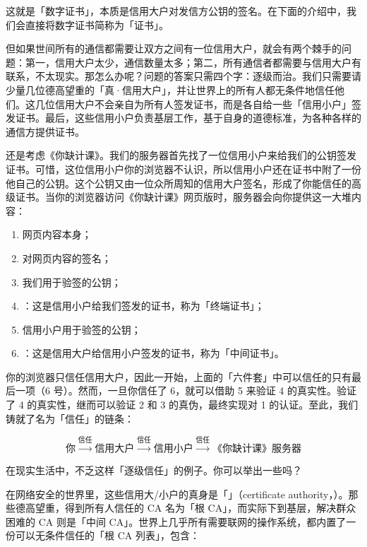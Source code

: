 这就是「数字证书」，本质是信用大户对发信方公钥的签名。在下面的介绍中，我们会直接将数字证书简称为「证书」。

但如果世间所有的通信都需要让双方之间有一位信用大户，就会有两个棘手的问题：第一，信用大户太少，通信数量太多；第二，所有通信者都需要与信用大户有联系，不太现实。那怎么办呢？问题的答案只需四个字：逐级而治。我们只需要请少量几位德高望重的「真·信用大户」，并让世界上的所有人都无条件地信任他们。这几位信用大户不会亲自为所有人签发证书，而是各自给一些「信用小户」签发证书。最后，这些信用小户负责基层工作，基于自身的道德标准，为各种各样的通信方提供证书。

还是考虑《你缺计课》。我们的服务器首先找了一位信用小户来给我们的公钥签发证书。可惜，这位信用小户你的浏览器不认识，所以信用小户还在证书中附了一份他自己的公钥。这个公钥又由一位众所周知的信用大户签名，形成了你能信任的高级证书。当你的浏览器访问《你缺计课》网页版时，服务器会向你提供这一大堆内容：

\begin{enumerate}
  \item 网页内容本身；
  \item 对网页内容的签名；
  \item 我们用于验签的公钥；
  \item {}：这是信用小户给我们签发的证书，称为「终端证书」；
  \item 信用小户用于验签的公钥；
  \item {}：这是信用大户给信用小户签发的证书，称为「中间证书」。
\end{enumerate}

你的浏览器只信任信用大户，因此一开始，上面的「六件套」中可以信任的只有最后一项（6 号）。然而，一旦你信任了 6，就可以借助 5 来验证 4 的真实性。验证了 4 的真实性，继而可以验证 2 和 3 的真伪，最终实现对 1 的认证。至此，我们铸就了名为「信任」的链条：

\[ \text{你}\xrightarrow{\text{信任}}\text{信用大户}\xrightarrow{\text{信任}}\text{信用小户}\xrightarrow{\text{信任}}\text{《你缺计课》服务器} \]

\begin{note}
  在现实生活中，不乏这样「逐级信任」的例子。你可以举出一些吗？
\end{note}

在网络安全的世界里，这些信用大/小户的真身是「」（certificate authority，）。那些德高望重，得到所有人信任的 CA 名为「根 CA」，而实际下到基层，解决群众困难的 CA 则是「中间 CA」。世界上几乎所有需要联网的操作系统，都内置了一份可以无条件信任的「根 CA 列表」，包含：

